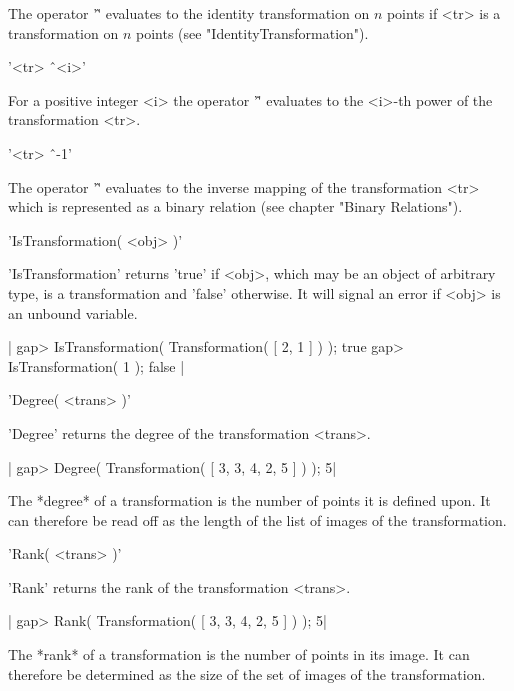 The operator '\^' evaluates to  the identity transformation on $n$ points
if <tr> is a transformation on $n$ points (see "IdentityTransformation").

\vspace{5mm}
'<tr> \^\ <i>'%

For a  positive integer  <i>  the operator  '\^' evaluates to  the <i>-th
power of the transformation <tr>.

\vspace{5mm}
'<tr> \^\ -1'%

The operator '\^' evaluates to the  inverse mapping of the transformation
<tr> which  is represented  as   a binary relation  (see chapter  "Binary
Relations").

%

'IsTransformation( <obj> )'

'IsTransformation' returns  'true' if  <obj>,  which may  be an object of
arbitrary type,  is  a  transformation  and 'false' otherwise.    It will
signal an error if <obj> is an unbound variable.

|    gap> IsTransformation( Transformation( [ 2, 1 ] ) );
    true
    gap> IsTransformation( 1 );
    false |


'Degree( <trans> )'

'Degree' returns the degree of the transformation <trans>.

|    gap> Degree( Transformation( [ 3, 3, 4, 2, 5 ] ) );
    5|
    
The *degree* of a  transformation is the number of  points it  is defined
upon.  It can therefore be  read off as the length  of the list of images
of the transformation.


'Rank( <trans> )'

'Rank' returns the rank of the transformation <trans>.

|    gap> Rank( Transformation( [ 3, 3, 4, 2, 5 ] ) );
    5|

The *rank* of a transformation is the number of  points in its image.  It
can  therefore be determined  as  the size of the   set of images  of the
transformation.

